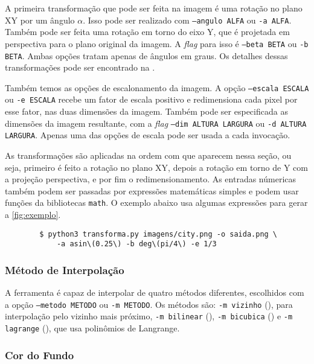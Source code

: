     A primeira transformação que pode ser feita na imagem é uma rotação no plano XY por um ângulo $\alpha$. Isso pode ser realizado com \texttt{--angulo ALFA} ou \texttt{-a ALFA}. Também pode ser feita uma rotação em torno do eixo Y, que é projetada em perspectiva para o plano original da imagem. A \textit{flag} para isso é \texttt{--beta BETA} ou \texttt{-b BETA}. Ambas opções tratam apenas de ângulos em graus. Os detalhes dessas transformações pode ser encontrado na .


    Também temos as opções de escalonamento da imagem. A opção \texttt{--escala ESCALA} ou \texttt{-e ESCALA} recebe um fator de escala positivo e redimensiona cada pixel por esse fator, nas duas dimensões da imagem. Também pode ser especificada as dimensões da imagem resultante, com a \textit{flag} \texttt{--dim ALTURA LARGURA} ou \texttt{-d ALTURA LARGURA}. Apenas uma das opções de escala pode ser usada a cada invocação.

    As transformações são aplicadas na ordem com que aparecem nessa seção, ou seja, primeiro é feito a rotação no plano XY, depois a rotação em torno de Y com a projeção perspectiva, e por fim o redimensionamento. As entradas númericas também podem ser passadas por expressões matemáticas simples e podem usar funções da bibliotecas \texttt{math}. O exemplo abaixo usa algumas expressões para gerar a \cref{fig:exemplo}.

    \begin{verbatim}
        $ python3 transforma.py imagens/city.png -o saida.png \
            -a asin\(0.25\) -b deg\(pi/4\) -e 1/3
    \end{verbatim}

\subsubsection{Método de Interpolação}

    A ferramenta é capaz de interpolar de quatro métodos diferentes, escolhidos com a opção \texttt{--metodo METODO} ou \texttt{-m METODO}. Os métodos são: \texttt{-m vizinho} (), para interpolação pelo vizinho mais próximo, \texttt{-m bilinear} (), \texttt{-m bicubica} () e \texttt{-m lagrange} (), que usa polinômios de Langrange.

\subsubsection{Cor do Fundo}

